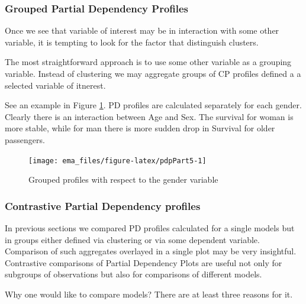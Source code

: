 \documentclass[12pt,]{krantz}
\begin{document}
\hypertarget{grouped-partial-dependency-profiles}{%
\subsubsection{Grouped Partial Dependency Profiles}\label{grouped-partial-dependency-profiles}}

Once we see that variable of interest may be in interaction with some other variable, it is tempting to look for the factor that distinguish clusters.

The most straightforward approach is to use some other variable as a grouping variable.
Instead of clustering we may aggregate groups of CP profiles defined a a selected variable of itnerest.

See an example in Figure \ref{fig:pdpPart5}. PD profiles are calculated separately for each gender. Clearly there is an interaction between Age and Sex. The survival for woman is more stable, while for man there is more sudden drop in Survival for older passengers.

\begin{figure}

{\centering \texttt{[image: ema\_files/figure-latex/pdpPart5-1]} 

}

\caption{Grouped profiles with respect to the gender variable}\label{fig:pdpPart5}
\end{figure}

\hypertarget{contrastive-partial-dependency-profiles}{%
\subsubsection{Contrastive Partial Dependency profiles}\label{contrastive-partial-dependency-profiles}}

In previous sections we compared PD profiles calculated for a single models but in groups either defined via clustering or via some dependent variable. Comparison of such aggregates overlayed in a single plot may be very insightful.
Contrastive comparisons of Partial Dependency Plots are useful not only for subgroups of observations but also for comparisons of different models.

Why one would like to compare models? There are at least three reasons for it.
\end{document}
